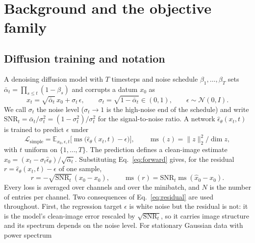 \section{Background and the objective family}
\label{sec:background}

\subsection{Diffusion training and notation}
\label{sec:notation}

A denoising diffusion model \citep{ho2020denoising} with $T$ timesteps and
noise schedule $\beta_1,\dots,\beta_T$ sets
$\bar\alpha_t = \prod_{s \le t}(1-\beta_s)$ and corrupts a datum $x_0$ as
\begin{equation}
  x_t = \sqrt{\bar\alpha_t}\,x_0 + \sigma_t\,\epsilon, \qquad
  \sigma_t = \sqrt{1-\bar\alpha_t} \in (0,1), \qquad
  \epsilon \sim \mathcal{N}(0, I).
  \label{eq:forward}
\end{equation}
We call $\sigma_t$ the noise level ($\sigma_t \to 1$ is the high-noise end of
the schedule) and write
$\mathrm{SNR}_t = \bar\alpha_t/\sigma_t^2 = (1-\sigma_t^2)/\sigma_t^2$ for the
signal-to-noise ratio. A network $\hat\epsilon_\theta(x_t, t)$ is trained to
predict $\epsilon$ under
\begin{equation}
  \mathcal{L}_{\mathrm{simple}}
  = \mathbb{E}_{x_0,\epsilon,t}\big[\operatorname{ms}\big(\hat\epsilon_\theta(x_t,t) - \epsilon\big)\big],
  \qquad
  \operatorname{ms}(z) = \lVert z \rVert_2^2 / \dim z ,
  \label{eq:simple}
\end{equation}
with $t$ uniform on $\{1, \dots, T\}$. The prediction defines a clean-image
estimate $\hat x_0 = (x_t - \sigma_t \hat\epsilon_\theta)/\sqrt{\bar\alpha_t}$.
Substituting Eq.~\eqref{eq:forward} gives, for the residual
$r = \hat\epsilon_\theta(x_t,t) - \epsilon$ of one sample,
\begin{equation}
  r = -\sqrt{\mathrm{SNR}_t}\,(\hat x_0 - x_0),
  \qquad
  \operatorname{ms}(r) = \mathrm{SNR}_t \operatorname{ms}(\hat x_0 - x_0).
  \label{eq:residual}
\end{equation}
Every loss is averaged over channels and over the minibatch, and $N$ is the
number of entries per channel. Two consequences of Eq.~\eqref{eq:residual}
are used throughout. First, the regression target $\epsilon$ is white noise
but the residual is not: it is the model's clean-image error rescaled by
$\sqrt{\mathrm{SNR}_t}$, so it carries image structure and its spectrum
depends on the noise level. For stationary Gaussian data with power spectrum
